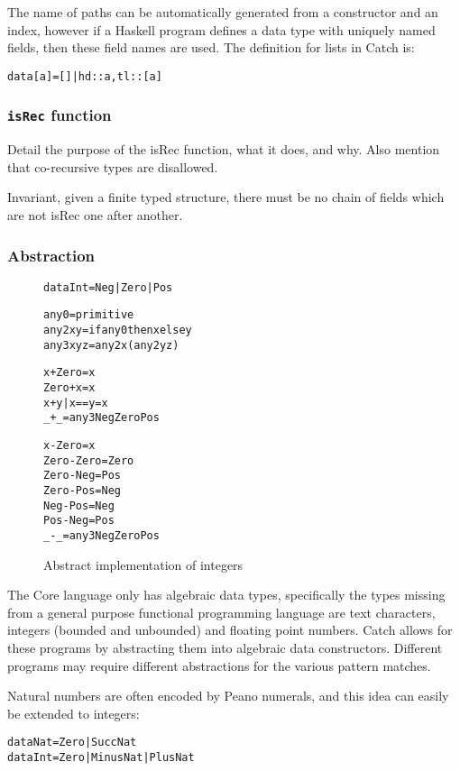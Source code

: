 \documentclass[preprint]{sigplanconf}
\newcommand{\T}[1]{\texttt{#1}}
\newenvironment{code}{\begin{alltt}\small}{\end{alltt}}
\begin{document}
The name of paths can be automatically generated from a constructor and an index, however if a Haskell program defines a data type with uniquely named fields, then these field names are used. The definition for lists in Catch is:

\begin{code}
data [a] = [] | {hd :: a, tl :: [a]}
\end{code}

\subsubsection{\T{isRec} function}

Detail the purpose of the isRec function, what it does, and why. Also mention that co-recursive types are disallowed.

Invariant, given a finite typed structure, there must be no chain of fields which are not isRec one after another.

\subsubsection{Abstraction}

\begin{figure}
\begin{code}
data Int = Neg | Zero | Pos

any0 = primitive
any2 x y = if any0 then x else y
any3 x y z = any2 x (any2 y z)

x + Zero = x
Zero + x = x
x + y | x == y = x
_ + _ = any3 Neg Zero Pos

x - Zero = x
Zero - Zero = Zero
Zero - Neg = Pos
Zero - Pos = Neg
Neg - Pos = Neg
Pos - Neg = Pos
_ - _ = any3 Neg Zero Pos
\end{code}
\caption{Abstract implementation of integers}
\label{fig:abstract_int}
\end{figure}

The Core language only has algebraic data types, specifically the types missing from a general purpose functional programming language are text characters, integers (bounded and unbounded) and floating point numbers. Catch allows for these programs by abstracting them into algebraic data constructors. Different programs may require different abstractions for the various pattern matches.

Natural numbers are often encoded by Peano numerals, and this idea can easily be extended to integers:

\begin{code}
data Nat = Zero | Succ Nat
data Int = Zero | Minus Nat | Plus Nat
\end{code}
\end{document}
